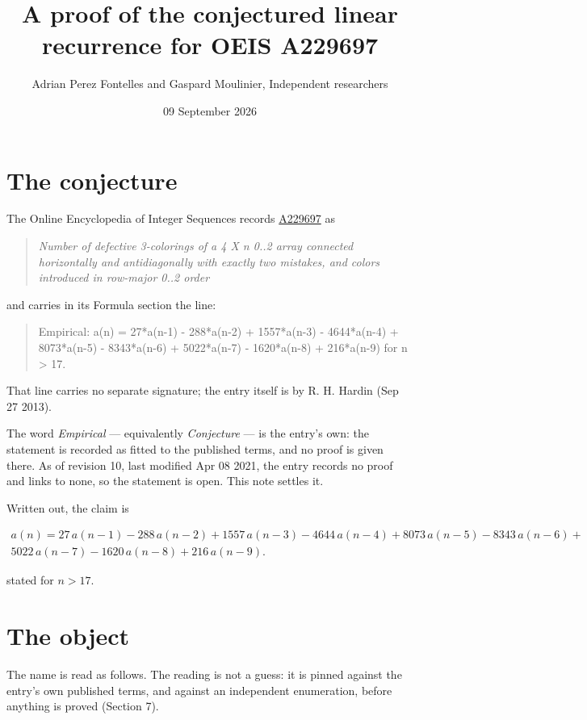 \documentclass[11pt]{article}
\title{A proof of the conjectured linear recurrence for OEIS A229697}
\author{Adrian Perez Fontelles and Gaspard Moulinier, Independent researchers}
\date{09 September 2026}
\theoremstyle{definition}
\begin{document}
\maketitle
\section{The conjecture}

The Online Encyclopedia of Integer Sequences records \href{https://oeis.org/A229697}{A229697} as

\begin{quote}\itshape Number of defective 3-colorings of a 4 X n 0..2 array connected horizontally and antidiagonally with exactly two mistakes, and colors introduced in row-major 0..2 order\end{quote}

and carries in its Formula section the line:

\begin{quote}\ttfamily Empirical: a(n) = 27*a(n-1) - 288*a(n-2) + 1557*a(n-3) - 4644*a(n-4) + 8073*a(n-5) - 8343*a(n-6) + 5022*a(n-7) - 1620*a(n-8) + 216*a(n-9) for n > 17.\end{quote}

That line carries no separate signature; the entry itself is by R. H. Hardin (Sep 27 2013).

The word {\itshape Empirical} --- equivalently {\itshape Conjecture} --- is the entry's own: the statement is recorded as fitted to the published terms, and no proof is given there. As of revision 10, last modified Apr 08 2021, the entry records no proof and links to none, so the statement is open. This note settles it.

Written out, the claim is

\begin{multline*} a(n) = 27\,a(n-1) - 288\,a(n-2) + 1557\,a(n-3) - 4644\,a(n-4) + 8073\,a(n-5) - 8343\,a(n-6) + \\ 5022\,a(n-7) - 1620\,a(n-8) + 216\,a(n-9). \end{multline*}

stated for $n > 17$.

\section{The object}

The name is read as follows. The reading is not a guess: it is pinned against the entry's own published terms, and against an independent enumeration, before anything is proved (Section 7).
\end{document}
